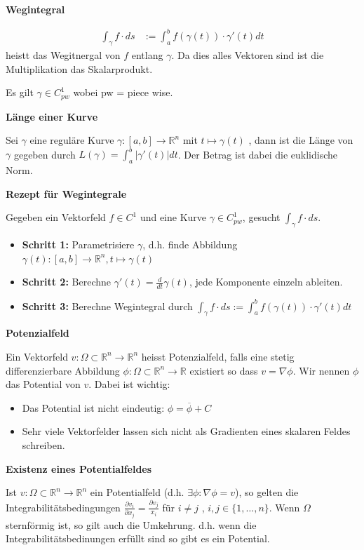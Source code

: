 \documentclass[25pt]{sciposter}
\newcommand{\R}{\mathbb{R}}
\newenvironment{method}[1]{\begin{mdframed}[backgroundcolor=blue!10,innertopmargin=15pt, innerbottommargin=15pt, nobreak=true]
		\textbf{#1 }
	}
	{ 
	\end{mdframed}
}
\begin{document}
\begin{multicols}{3}
\begin{method}{Wegintegral}
	\begin{align*}
		\int_\gamma f \cdot ds &:= \int_{a}^{b} f(\gamma(t)) \cdot \gamma'(t) dt
	\end{align*}
	heistt das Wegitnergal von $f$ entlang $\gamma$. Da dies alles Vektoren sind ist die Multiplikation das Skalarprodukt.
	
	Es gilt $\gamma  \in C^1_{pw}$ wobei pw = piece wise.
\end{method}

\begin{method}{Länge einer Kurve}
	Sei $\gamma$ eine reguläre Kurve $\gamma : [a,b]\to \R^n$ mit $t \mapsto \gamma(t)$ , dann ist die Länge von $\gamma$ gegeben durch $L(\gamma) = \int_{a}^{b} |\gamma'(t)| dt$. Der Betrag ist dabei die euklidische Norm.
\end{method}

\begin{method}{Rezept für Wegintegrale}
	Gegeben ein Vektorfeld $f \in C^1$ und eine Kurve $\gamma \in C^1_{pw}$, gesucht $\int_\gamma f\cdot ds$.
	\begin{itemize}
		\item \textbf{Schritt 1:} Parametrisiere $\gamma$, d.h. finde Abbildung $\gamma(t):[a,b]\to\R^n,t\mapsto\gamma(t)$
		\item \textbf{Schritt 2:} Berechne $\gamma'(t) = \frac{d}{dt} \gamma(t)$, jede Komponente einzeln ableiten.
		\item \textbf{Schritt 3:} Berechne Wegintegral durch $\int_\gamma f\cdot ds := \int_{a}^{b} f(\gamma(t)) \cdot \gamma' (t) dt$
	\end{itemize}
	
\end{method}


\begin{method}{Potenzialfeld}
	Ein Vektorfeld $v:\Omega\subset \R^n \to \R^n$ heisst Potenzialfeld, falls eine stetig differenzierbare Abbildung $\phi:\Omega \subset \R^n \to \R$ existiert so dass $v = \nabla \phi$. Wir nennen $\phi$ das Potential von $v$. Dabei ist wichtig:
	\begin{itemize}
		\item Das Potential ist nicht eindeutig: $\phi = \overline{\phi} + C$
		\item Sehr viele Vektorfelder lassen sich nicht als Gradienten eines skalaren Feldes schreiben.
	\end{itemize}
\end{method}

\begin{method}{Existenz eines Potentialfeldes}
	Ist $v : \Omega \subset \R^n \to \R^n$ ein Potentialfeld (d.h. $\exists \phi : \nabla \phi = v$), so gelten die Integrabilitätsbedingungen $\frac{\partial v_i}{\partial x_j} = \frac{\partial v_j}{x_i}$ für $i\neq j$ , $i,j\in\{1,\ldots,n\}$. Wenn $\Omega$ sternförmig ist, so gilt auch die Umkehrung. d.h. wenn die Integrabilitätsbedinungen erfüllt sind so gibt es ein Potential.
	

\end{method}
\end{multicols}
\end{document}
